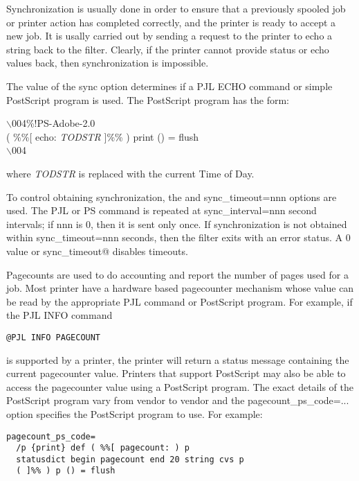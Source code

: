 \documentclass[a4paper]{article}
\begin{document}
Synchronization is usually done in order to ensure that a previously
spooled job or printer action has completed correctly,
and the printer is ready to accept a new job.
It is usally carried out by sending a request to the printer to
echo a string back to the filter.
Clearly,
if the printer cannot provide status or echo values back,
then synchronization is impossible.

The value of the
{\ttfamily sync} option determines if a PJL ECHO command or simple PostScript 
program is used.
The PostScript program has the form:
\begin{tscreen}
$\backslash$004\%!PS-Adobe-2.0\\ 
( \%\%{[} echo: {\itshape TODSTR\/} ]\%\% ) print () = flush\\ 
$\backslash$004
\end{tscreen}


where {\itshape TODSTR\/} is replaced with the current Time of Day.

To control obtaining synchronization,
the
and
{\ttfamily sync\_timeout=nnn}
options are used.
The PJL or PS command is repeated at
{\ttfamily sync\_interval=nnn}
second intervals; if nnn is 0, then it is sent only once.
If synchronization is not obtained within
{\ttfamily sync\_timeout=nnn}
seconds, then the filter exits with an error status.
A 0 value or
{\ttfamily sync\_timeout@}
disables timeouts.

Pagecounts are used to do accounting and report the number of pages
used for a job.
Most printer have a hardware based pagecounter mechanism whose value
can be read by the appropriate PJL command or PostScript program.
For example, if the PJL INFO command
\begin{tscreen}
\begin{verbatim}
@PJL INFO PAGECOUNT
\end{verbatim}
\end{tscreen}

is supported by a printer,
the printer will return a status message containing the current pagecounter
value.
Printers that support PostScript may also be able to access the pagecounter
value using a PostScript program.
The exact details of the PostScript program vary from vendor to vendor and
the
{\ttfamily pagecount\_ps\_code=...}
option specifies the PostScript program to use.
For example:
\begin{tscreen}
\begin{verbatim}
pagecount_ps_code=
  /p {print} def ( %%[ pagecount: ) p
  statusdict begin pagecount end 20 string cvs p
  ( ]%% ) p () = flush
\end{verbatim}
\end{tscreen}
\end{document}
